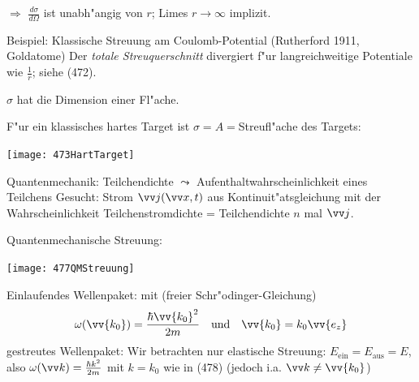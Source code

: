 \documentclass[a4paper]{scrartcl}
\begin{document}
$\Longrightarrow$ $\frac{d\sigma}{d\Omega}$ ist unabh"angig von $r$; Limes $r \longrightarrow \infty$ implizit.

Beispiel: Klassische Streuung am Coulomb-Potential (Rutherford 1911, Goldatome)
Der \emph{totale Streuquerschnitt}
divergiert f"ur langreichweitige Potentiale wie $\frac1r$; siehe (472).

$\sigma$ hat die Dimension einer Fl"ache.

F"ur ein klassisches hartes Target ist $\sigma = A = $Streufl"ache des Targets:
\begin{center}
\texttt{[image: 473HartTarget]}
\end{center}
Quantenmechanik:
\setcounter{equation}{165}
Teilchendichte $\leadsto$ Aufenthaltwahrscheinlichkeit eines Teilchens
\setcounter{equation}{473}
Gesucht: Strom $\vv j(\vv x, t)$ aus Kontinuit"atsgleichung
 mit der Wahrscheinlichkeit 
Teilchenstromdichte = Teilchendichte $n$ mal $\vv j$.

Quantenmechanische Streuung:
\begin{center}
\texttt{[image: 477QMStreuung]}
\end{center}
Einlaufendes Wellenpaket:
mit (freier Schr"odinger-Gleichung)
$$\omega(\vv{k_0}) = \frac{\hbar \vv{k_0}^2}{2m} \quad \mathrm{und} \quad \vv{k_0} = k_0 \vv{e_z}$$
gestreutes Wellenpaket:
Wir betrachten nur elastische Streuung: $E_\mathrm{ein} = E_\mathrm{aus} = E$, also $\omega(\vv k) = \frac{\hbar k^2}{2m}$ mit $k=k_0$ wie in (478) (jedoch i.a. $\vv k \neq \vv{k_0}$)
\end{document}

